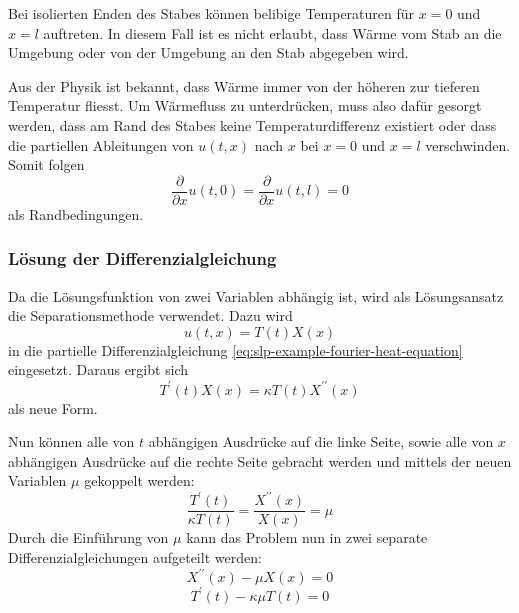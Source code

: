 Bei isolierten Enden des Stabes können belibige Temperaturen für $x = 0$ und
$x = l$ auftreten. In diesem Fall ist es nicht erlaubt, dass Wärme vom Stab
an die Umgebung oder von der Umgebung an den Stab abgegeben wird.

Aus der Physik ist bekannt, dass Wärme immer von der höheren zur tieferen
Temperatur fliesst. Um Wärmefluss zu unterdrücken, muss also dafür gesorgt
werden, dass am Rand des Stabes keine Temperaturdifferenz existiert oder 
dass die partiellen Ableitungen von $u(t,x)$ nach $x$ bei $x = 0$ und $x = l$
verschwinden.
Somit folgen
\begin{equation}
    \label{eq:slp-example-fourier-boundary-condition-ends-isolated}
    \frac{\partial}{\partial x} u(t, 0)
    =
    \frac{\partial}{\partial x} u(t, l)
    =
    0
\end{equation}
als Randbedingungen.

%
%

\subsubsection{Lösung der Differenzialgleichung}

Da die Lösungsfunktion von zwei Variablen abhängig ist, wird als Lösungsansatz
die Separationsmethode verwendet.
Dazu wird 
\[
    u(t,x)
    =
    T(t)X(x)
\]
in die partielle Differenzialgleichung 
\eqref{eq:slp-example-fourier-heat-equation} eingesetzt.
Daraus ergibt sich 
\[
    T^{\prime}(t)X(x)
    =
    \kappa T(t)X^{\prime \prime}(x)
\]
als neue Form.

Nun können alle von $t$ abhängigen Ausdrücke auf die linke Seite, sowie alle
von $x$ abhängigen Ausdrücke auf die rechte Seite gebracht werden und mittels
der neuen Variablen $\mu$ gekoppelt werden:
\[
    \frac{T^{\prime}(t)}{\kappa T(t)}
    =
    \frac{X^{\prime \prime}(x)}{X(x)}
    =
    \mu
\]
Durch die Einführung von $\mu$ kann das Problem nun in zwei separate
Differenzialgleichungen aufgeteilt werden:
\begin{equation}
    \label{eq:slp-example-fourier-separated-x}
    X^{\prime \prime}(x) - \mu X(x)
    =
    0
\end{equation}
\begin{equation}
    \label{eq:slp-example-fourier-separated-t}
    T^{\prime}(t) - \kappa \mu T(t)
    =
    0
\end{equation}

%
%

